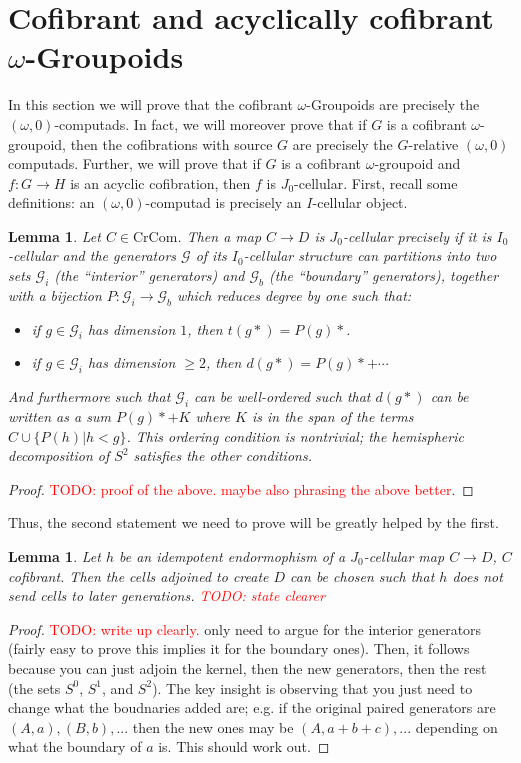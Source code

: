 \documentclass[12pt]{article}
\newtheorem{lemma}[theorem]{Lemma}
\theoremstyle{definition}
\newcommand{\TODO}[1]{\textcolor{red}{TODO: {#1}}}
\newcommand{\crcom}{\text{CrCom}}
\begin{document}
\section{Cofibrant and acyclically cofibrant $\omega$-Groupoids}
	In this section we will prove that the cofibrant $\omega$-Groupoids are precisely the $(\omega,0)$-computads. In fact, we will moreover prove that if $G$ is a cofibrant $\omega$-groupoid, then the cofibrations with source $G$ are precisely the $G$-relative $(\omega,0)$ computads. Further, we will prove that if $G$ is a cofibrant $\omega$-groupoid and $f: G \to H$ is an acyclic cofibration, then $f$ is $J_0$-cellular.
	\indent First, recall some definitions: an $(\omega,0)$-computad is precisely an $I$-cellular object.
	\begin{lemma}
		Let $C \in \crcom$. Then a map $C \to D$ is $J_0$-cellular precisely if it is $I_0$-cellular and the generators $\mathcal{G}$ of its $I_0$-cellular structure can partitions into two sets $\mathcal{G}_i$ (the ``interior'' generators) and $\mathcal{G}_b$ (the ``boundary'' generators), together with a bijection $P: \mathcal{G}_i \to \mathcal{G}_b$ which reduces degree by one such that:
		\begin{itemize}
			\item if $g \in \mathcal{G}_i$ has dimension $1$, then $t(g*) = P(g)*$.
			\item if $g \in \mathcal{G}_i$ has dimension $\ge 2$, then $d(g*) = P(g)* + \cdots $
		\end{itemize}
		And furthermore such that $\mathcal{G}_i$ can be well-ordered such that $d(g*)$ can be written as a sum $P(g)* + K$ where $K$ is in the span of the terms $C \cup \{P(h) | h < g\}$. This ordering condition is nontrivial; the hemispheric decomposition of $S^2$ satisfies the other conditions.
	\end{lemma}
	\begin{proof}
		\TODO{proof of the above. maybe also phrasing the above better}.
	\end{proof}
	Thus, the second statement we need to prove will be greatly helped by the first.
	\begin{lemma}
		Let $h$ be an idempotent endormophism of a $J_0$-cellular map $C \to D$, $C$ cofibrant. Then the cells adjoined to create $D$ can be chosen such that $h$ does not send cells to later generations. \TODO{state clearer}
	\end{lemma}
	\begin{proof}
		\TODO{write up clearly.} only need to argue for the interior generators (fairly easy to prove this implies it for the boundary ones). Then, it follows because you can just adjoin the kernel, then the new generators, then the rest (the sets $S^0$, $S^1$, and $S^2$). The key insight is observing that you just need to change what the boudnaries added are; e.g. if the original paired generators are $(A,a), (B,b),...$ then the new ones may be $(A, a + b + c), ...$ depending on what the boundary of $a$ is. This should work out. 
	\end{proof}
\end{document}
